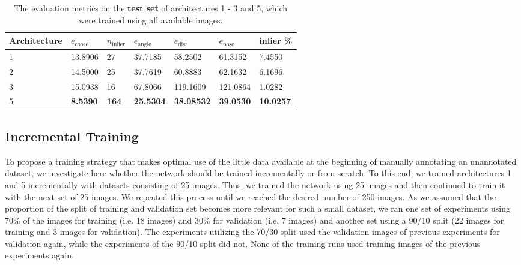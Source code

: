 \begin{table}[b]
\centering
\begin{tabular}{|l||llllll|} \hline
Architecture & $e_{\text{coord}}$ & $n_{\text{inlier}}$ & $e_{\text{angle}}$ & $e_{\text{dist}}$ & $e_{\text{pose}}$ & inlier \% \\ \hline \hline \rowcolor{Gray}
1            & 13.8906   & 27   & 37.7185   & 58.2502  & 61.3152    & 7.4550 \\ \hline
2            & 14.5000   & 25   & 37.7619   & 60.8883  & 62.1632   & 6.1696           \\ \hline \rowcolor{Gray}
3            & 15.0938    & 16   & 67.8066   & 119.1609  & 121.0864   & 1.0282         \\ \hline
5            & \textbf{8.5390}    & \textbf{164}   & \textbf{25.5304}   & \textbf{38.08532}  & \textbf{39.0530} & \textbf{10.0257} \\ \hline       
\end{tabular}
\caption{The evaluation metrics on the \textbf{test set} of architectures 1 - 3 and 5, which were trained using all available images.}
\label{table:architecture_test_metrics_comparison}
\end{table}

\subsection{Incremental Training} \label{subsection:experiments_online_learning}

To propose a training strategy that makes optimal use of the little data available at the beginning of manually annotating an unannotated dataset, we investigate here whether the network should be trained incrementally or from scratch. To this end, we trained architectures 1 and 5 incrementally with datasets consisting of 25 images. Thus, we trained the network using 25 images and then continued to train it with the next set of 25 images. We repeated this process until we reached the desired number of 250 images. As we assumed that the proportion of the split of training and validation set becomes more relevant for such a small dataset, we ran one set of experiments using 70\% of the images for training (i.e. 18 images) and 30\% for validation (i.e. 7 images) and another set using a 90/10 split (22 images for training and 3 images for validation). The experiments utilizing the 70/30 split used the validation images of previous experiments for validation again, while the experiments of the 90/10 split did not. None of the training runs used training images of the previous experiments again.

